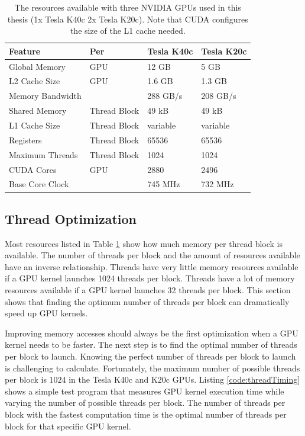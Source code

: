\begin{table}
\caption{The resources available with three NVIDIA GPUs used in this thesis (1x Tesla K40c 2x Tesla K20c). Note that CUDA configures the size of the L1 cache needed.}
\begin{center}
\begin{tabular}{llll}
	\toprule
	Feature 			& Per			& Tesla K40c 	& Tesla K20c	\\ \midrule
	Global Memory 		& GPU			& 12 GB	 		& 5 GB			\\
	L2 Cache Size 		& GPU			& 1.6 GB		& 1.3 GB		\\
	Memory Bandwidth	& 				& 288 GB/s		& 208 GB/s		\\		
	Shared Memory 		& Thread Block	& 49 kB			& 49 kB			\\
	L1 Cache Size 		& Thread Block	& variable		& variable		\\
	Registers			& Thread Block	& 65536			& 65536			\\
	Maximum Threads		& Thread Block	& 1024			& 1024			\\
	CUDA Cores 			& GPU			& 2880 			& 2496 			\\
	Base Core Clock 	&				& 745 MHz 		& 732 MHz		\\ \bottomrule
\end{tabular}
\end{center}
\label{tab:gpu-resources_jeffs}
\end{table}

\subsection{Thread Optimization}
Most resources listed in Table \ref{tab:gpu-resources_jeffs} show how much memory per thread block is available. 
The number of threads per block and the amount of resources available have an inverse relationship.
Threads have very little memory resources available if a GPU kernel launches 1024 threads per block.
Threads have a lot of memory resources available if a GPU kernel launches 32 threads per block.
This section shows that finding the optimum number of threads per block can dramatically speed up GPU kernels.

Improving memory accesses should always be the first optimization when a GPU kernel needs to be faster.
The next step is to find the optimal number of threads per block to launch.
Knowing the perfect number of threads per block to launch is challenging to calculate.
Fortunately, the maximum number of possible threads per block is $1024$ in the Tesla K40c and K20c GPUs.
Listing \ref{code:threadTiming} shows a simple test program that measures GPU kernel execution time while varying the number of possible threads per block.
The number of threads per block with the fastest computation time is the optimal number of threads per block for that specific GPU kernel.

